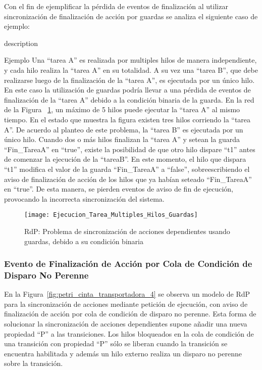 Con el fin de ejemplificar la pérdida de eventos de finalización al utilizar
sincronización de finalización de acción por guardas se analiza el siguiente
caso de ejemplo:
\begin{labeling}{description}
\item [Ejemplo]
	Una ``tarea A'' es realizada por multiples hilos de manera independiente, y cada
	hilo realiza la ``tarea A'' en su totalidad. A su vez una ``tarea B'', que
	debe realizarse luego de la finalización de la ``tarea A'', es ejecutada por
	un único hilo. En este caso la utilización de guardas podría llevar a una
	pérdida de eventos de finalización de la ``tarea A'' debido a la condición
	binaria de la guarda. En la red de la Figura
	~\ref{fig:ejecucion_multiples_hilos_guardas}, un máximo de 5 hilos puede
	ejecutar la ``tarea A'' al mismo tiempo. En el estado que muestra la
	figura existen tres hilos corriendo la ``tarea A''. De acuerdo al planteo de
	este problema, la ``tarea B'' es ejecutada por un único hilo. Cuando dos o más
	hilos finalizan la ``tarea A'' y setean la guarda ``Fin\_TareaA'' en ``true'',
	existe la posibilidad de que otro hilo dispare ``t1'' antes de comenzar la
	ejecución de la ``tareaB''. En este momento, el hilo que dispara ``t1''
	modifica el valor de la guarda ``Fin\_TareaA'' a ``false'', sobreescribiendo
	el aviso de finalización de acción de los hilos que ya habían seteado
	``Fin\_TareaA'' en ``true''. De esta manera, se pierden eventos de aviso de fin
	de ejecución, provocando la incorrecta sincronización del sistema.
\end{labeling}

\begin{figure}[H]
    \centering
    \texttt{[image: Ejecucion\_Tarea\_Multiples\_Hilos\_Guardas]}
    \caption{RdP: Problema de sincronización de acciones dependientes usando
    guardas, debido a su condición binaria}
    \label{fig:ejecucion_multiples_hilos_guardas}
\end{figure}


\subsubsection{Evento de Finalización de Acción por Cola de Condición de
Disparo No Perenne}
En la Figura~\ref{fig:petri_cinta_transportadora_4} se observa un modelo de
RdP para la sincronización de acciones mediante petición de ejecución, con aviso
de finalización de acción por cola de condición de disparo no perenne. 
Esta forma de solucionar la sincronización de acciones dependientes
supone añadir una nueva propiedad ``P'' a las transiciones. Los hilos
bloqueados en la cola de condición de una transición con propiedad ``P'' sólo
se liberan cuando la transición se encuentra habilitada y además un hilo
externo realiza un disparo no perenne sobre la transición.

